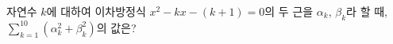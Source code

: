 자연수 $k$에 대하여 이차방정식 $x^2-kx-(k+1)=0$의 두 근을 $\alpha_k$, $\beta_k$라 할 때, $\displaystyle\sum_{k=1}^{10} (\alpha_k^2+\beta_k^2)$의 값은?
